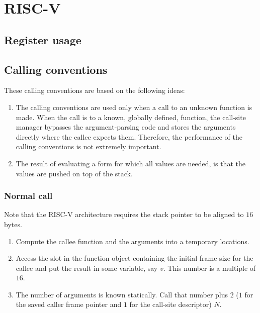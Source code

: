 \chapter{RISC-V}
\label{chapter-backend-risc-v}

\section{Register usage}
\label{sec-backend-risc-v-register-usage}

\section{Calling conventions}
\label{sec-backend-risc-v-calling-conventions}

These calling conventions are based on the following ideas:

\begin{enumerate}
\item The calling conventions are used only when a call to an unknown
  function is made.  When the call is to a known, globally defined,
  function, the call-site manager bypasses the argument-parsing code
  and stores the arguments directly where the callee expects them.
  Therefore, the performance of the calling conventions is not
  extremely important.
\item The result of evaluating a form for which all values are needed,
  is that the values are pushed on top of the stack.
\end{enumerate}

\subsection{Normal call}

Note that the RISC-V architecture requires the stack pointer to be
aligned to $16$ bytes.

\begin{enumerate}
\item Compute the callee function and the arguments into a temporary
  locations.
\item Access the slot in the function object containing the initial
  frame size for the callee and put the result in some variable, say
  $v$.  This number is a multiple of $16$.
\item The number of arguments is known statically.  Call that number
  plus $2$ ($1$ for the saved caller frame pointer and $1$ for the
  call-site descriptor) $N$.  

\end{enumerate}

